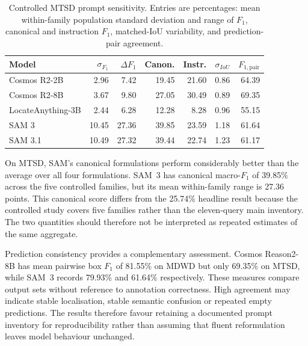 \begin{table}[htbp]
\centering
\small
\caption{Controlled MTSD prompt sensitivity. Entries are percentages: mean within-family population standard deviation and range of $F_1$, canonical and instruction $F_1$, matched-\gls{IoU} variability, and prediction-pair agreement.}
\label{tab:ev-mtsd-sensitivity}
\renewcommand{\arraystretch}{1.15}
\begin{tabularx}{\textwidth}{@{}>{\raggedright\arraybackslash}Xrrrrrr@{}}
\toprule
Model & $\sigma_{F_1}$ & $\Delta F_1$ & Canon. & Instr. & $\sigma_{IoU}$ & $F_{1,\mathrm{pair}}$ \\
\midrule
Cosmos R2-2B & 2.96 & 7.42 & 19.45 & 21.60 & 0.86 & 64.39 \\
Cosmos R2-8B & 3.67 & 9.80 & 27.05 & 30.49 & 0.89 & 69.35 \\
LocateAnything-3B & 2.44 & 6.28 & 12.28 & 8.28 & 0.96 & 55.15 \\
SAM 3 & 10.45 & 27.36 & 39.85 & 23.59 & 1.18 & 61.64 \\
SAM 3.1 & 10.49 & 27.32 & 39.44 & 22.74 & 1.23 & 61.17 \\
\bottomrule
\end{tabularx}
\end{table}


On \gls{MTSD}, SAM's canonical formulations perform considerably better than the average over all four formulations. SAM~3 has canonical macro-\(F_1\) of 39.85\% across the five controlled families, but its mean within-family range is 27.36 points. This canonical score differs from the 25.74\% headline result because the controlled study covers five families rather than the eleven-query main inventory. The two quantities should therefore not be interpreted as repeated estimates of the same aggregate.

Prediction consistency provides a complementary assessment. Cosmos Reason2-8B has mean pairwise box \(F_1\) of 81.55\% on MDWD but only 69.35\% on MTSD, while SAM~3 records 79.93\% and 61.64\% respectively. These measures compare output sets without reference to annotation correctness. High agreement may indicate stable localisation, stable semantic confusion or repeated empty predictions. The results therefore favour retaining a documented prompt inventory for reproducibility rather than assuming that fluent reformulation leaves model behaviour unchanged.

